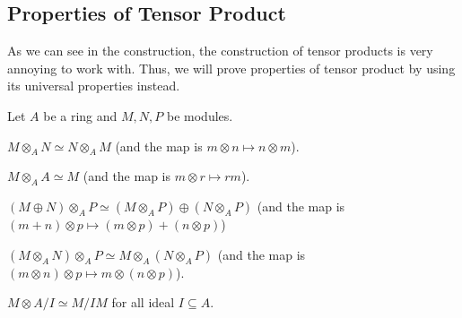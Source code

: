 \subsection{Properties of Tensor Product}
As we can see in the construction,
the construction of tensor products 
is very annoying to work with.
Thus, we will prove properties of tensor product
by using its universal properties instead.
\begin{proposition}
    \label{prop:tensor}
    Let $A$ be a ring and $M,N,P$ be modules.
    \begin{alphenum}
    \item $M\otimes_A N \simeq N\otimes_A M$
    (and the map is $m\otimes n\mapsto n\otimes m$).
    \item $M\otimes_A A\simeq M$ (and the map is 
    $m\otimes r\mapsto rm$).
    \item $(M\oplus N)\otimes_A P
    \simeq (M\otimes_A P) \oplus (N\otimes_A P)$
    (and the map is $(m+n)\otimes p \mapsto (m\otimes p)
    + (n\otimes p)$)
    \item $(M\otimes_A N)\otimes_A P
    \simeq M\otimes_A (N\otimes_A P)$
    (and the map is $(m\otimes n)\otimes p
    \mapsto m\otimes (n\otimes p)$).
    \item $M\otimes A/I \simeq M/IM$
    for all ideal $I\subseteq A$.
    \end{alphenum}
\end{proposition}
